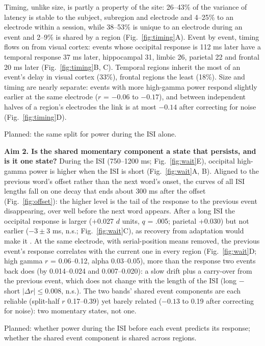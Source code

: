 \documentclass[11pt]{article}
\begin{document}
Timing, unlike size, is partly a property of the site: 26--43\% of the variance of latency is stable to the subject,
subregion and electrode and 4--25\% to an electrode within a session, while 38--53\% is unique to an electrode during
an event and 2--9\% is shared by a region (Fig.~\ref{fig:timing}A). Event by event, timing flows on from visual
cortex: events whose occipital response is 112 ms later have a temporal response 37 ms later, hippocampal 31,
limbic 26, parietal 22 and frontal 20 ms later (Fig.~\ref{fig:timing}B, C). Temporal regions inherit the most of an
event's delay in visual cortex (33\%), frontal regions the least (18\%). Size and timing are nearly separate: events
with more high-gamma power respond slightly earlier at the same electrode ($r$ = $-0.06$ to $-0.17$), and between
independent halves of a region's electrodes the link is at most $-0.14$ after correcting for noise
(Fig.~\ref{fig:timing}D).

Planned: the same split for power during the ISI alone.

\textbf{Aim 2. Is the shared momentary component a state that persists, and is it one state?} During the
ISI (750--1200 ms; Fig.~\ref{fig:wait}E), occipital high-gamma power is higher when the ISI is short (Fig.~\ref{fig:wait}A, B). Aligned to the
previous word's offset rather than the next word's onset, the curves of all ISI lengths fall on one
decay that ends about 300 ms after the offset (Fig.~\ref{fig:offset}): the higher level is the tail of the response
to the previous event disappearing, over well before the next word appears. After a long ISI the
occipital response is larger (+0.027 $d$ units, $q$ = .005; parietal +0.030) but not earlier ($-3 \pm 3$ ms, n.s.;
Fig.~\ref{fig:wait}C), as recovery from adaptation would make it \citep{Groen_2022}. At the same electrode, with serial-position means removed, the previous event's response correlates
with the current one in every region (Fig.~\ref{fig:wait}D; high gamma $r$ = 0.06--0.12, alpha 0.03--0.05), more than
the response two events back does (by 0.014--0.024 and 0.007--0.020): a slow drift plus a carry-over from the
previous event, which does not change with the length of the ISI (long $-$ short $|\Delta r| \le
0.008$, n.s.). The two bands' shared event components are each reliable (split-half $r$ 0.17--0.39) yet barely
related ($-0.13$ to 0.19 after correcting for noise): two momentary states, not one.

Planned: whether power during the ISI before each event predicts its response; whether the shared event
component is shared across regions.
\end{document}
